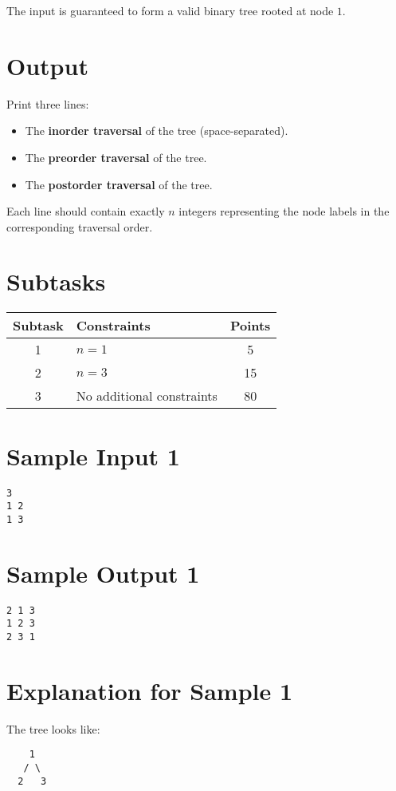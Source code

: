 \documentclass[12pt,a4paper]{article}
\begin{document}
The input is guaranteed to form a valid binary tree rooted at node $1$.

\section*{Output}
Print three lines:
\begin{itemize}
  \item The \textbf{inorder traversal} of the tree (space-separated).  
  \item The \textbf{preorder traversal} of the tree.  
  \item The \textbf{postorder traversal} of the tree.  
\end{itemize}

Each line should contain exactly $n$ integers representing the node labels in the corresponding traversal order.

\section*{Subtasks}
\begin{center}
\begin{tabularx}{\textwidth}{|c|X|c|}
\hline
\textbf{Subtask} & \textbf{Constraints} & \textbf{Points} \\
\hline
1 & $n = 1$ & 5 \\
\hline
2 & $n = 3$ & 15 \\
\hline
3 & No additional constraints & 80 \\
\hline
\end{tabularx}
\end{center}

\section*{Sample Input 1}
\begin{verbatim}
3
1 2
1 3
\end{verbatim}

\section*{Sample Output 1}
\begin{verbatim}
2 1 3
1 2 3
2 3 1
\end{verbatim}

\section*{Explanation for Sample 1}
The tree looks like:
\begin{verbatim}
    1
   / \
  2   3
\end{verbatim}
\end{document}
